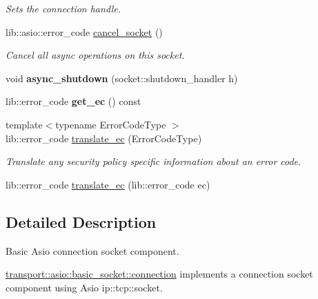 \begin{DoxyCompactItemize}
\begin{DoxyCompactList}\small\item\em Sets the connection handle. \end{DoxyCompactList}\item 
lib\+::asio\+::error\+\_\+code \mbox{\hyperlink{classwebsocketpp_1_1transport_1_1asio_1_1basic__socket_1_1connection_aaf1e0b99023c2653ebbe7953c874cc6d}{cancel\+\_\+socket}} ()
\begin{DoxyCompactList}\small\item\em Cancel all async operations on this socket. \end{DoxyCompactList}\item 
\mbox{\label{classwebsocketpp_1_1transport_1_1asio_1_1basic__socket_1_1connection_ac82ce93dad13c5b909367c75a3195759}} 
void {\bfseries async\+\_\+shutdown} (socket\+::shutdown\+\_\+handler h)
\item 
\mbox{\label{classwebsocketpp_1_1transport_1_1asio_1_1basic__socket_1_1connection_a959b352b412f30394a4e480bab01b7c7}} 
lib\+::error\+\_\+code {\bfseries get\+\_\+ec} () const
\item 
{\footnotesize template$<$typename Error\+Code\+Type $>$ }\\lib\+::error\+\_\+code \mbox{\hyperlink{classwebsocketpp_1_1transport_1_1asio_1_1basic__socket_1_1connection_a3ce50f4cb485ca4e98577f9f7af4b635}{translate\+\_\+ec}} (Error\+Code\+Type)
\begin{DoxyCompactList}\small\item\em Translate any security policy specific information about an error code. \end{DoxyCompactList}\item 
lib\+::error\+\_\+code \mbox{\hyperlink{classwebsocketpp_1_1transport_1_1asio_1_1basic__socket_1_1connection_a92b3f3132f48c3b57f48514557f6e653}{translate\+\_\+ec}} (lib\+::error\+\_\+code ec)
\end{DoxyCompactItemize}


\subsection{Detailed Description}
Basic Asio connection socket component. 

\mbox{\hyperlink{classwebsocketpp_1_1transport_1_1asio_1_1basic__socket_1_1connection}{transport\+::asio\+::basic\+\_\+socket\+::connection}} implements a connection socket component using Asio ip\+::tcp\+::socket. 

